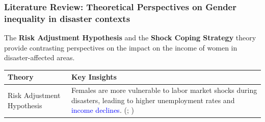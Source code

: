 \documentclass[serif, aspectratio=169]{beamer}
\begin{document}
\begin{frame}[label=literature_review2]
\frametitle{Literature Review: Theoretical Perspectives on Gender inequality in disaster contexts}








The \textbf{Risk Adjustment Hypothesis} and the \textbf{Shock Coping Strategy} theory provide contrasting perspectives on the impact on the income of women in disaster-affected areas.

\vspace{0.2cm}

    \begin{table}[ht]
        \centering
        \begin{tabular}{>{\raggedright}p{3cm} p{10cm}}
            \hline
            \textbf{Theory} & \textbf{Key Insights} \\
            \hline

\addlinespace

            Risk Adjustment Hypothesis & Females are more vulnerable to labor market shocks during disasters, leading to higher unemployment rates and \textcolor{blue}{income declines}. (\citealt{Kim2014ARetention}; \citealt{Groger2016InternalTyphoon})\\


\end{tabular}
\end{table}
\end{frame}
\end{document}
